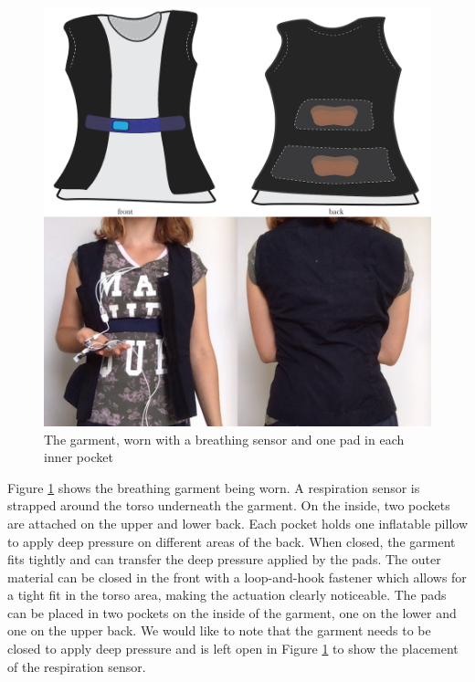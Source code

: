  \begin{figure}[t]
  \centering  
    \includegraphics[width=0.8\linewidth]{Chapters/Figures/soma_chi/fig_5_all_grid.png}
  \caption{The garment, worn with a breathing sensor and one pad in each inner pocket}
  \label{fig:garment}
\end{figure}

Figure \ref{fig:garment} shows the breathing garment being worn. A respiration sensor is strapped around the torso underneath the garment. On the inside, two pockets are attached on the upper and lower back. Each pocket holds one inflatable pillow to apply deep pressure on different areas of the back. When closed, the garment fits tightly and can transfer the deep pressure applied by the pads. The outer material can be closed in the front with a loop-and-hook fastener which allows for a tight fit in the torso area, making the actuation clearly noticeable. The pads can be placed in two pockets on the inside of the garment, one on the lower and one on the upper back. We would like to note that the garment needs to be closed to apply deep pressure and is left open in Figure \ref{fig:garment} to show the placement of the respiration sensor.


